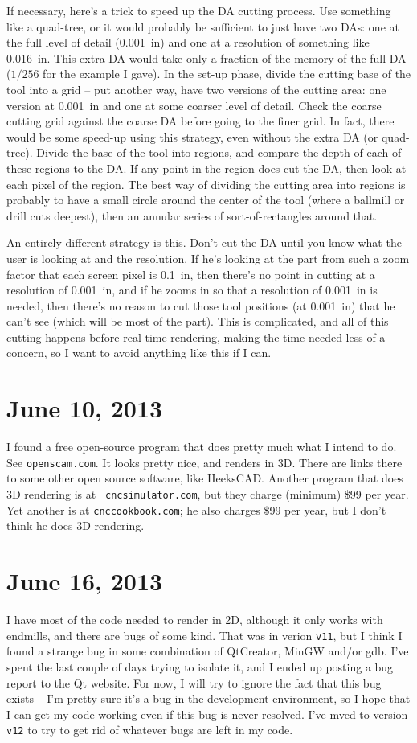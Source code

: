 \documentclass[titlepage,oneside,10pt]{article}
\begin{document}
If necessary, here's a trick to speed up the DA cutting process. Use
something like a quad-tree, or it would probably be sufficient to just
have two DAs: one at the full level of detail (0.001~in) and one at a
resolution of something like 0.016~in. This extra DA would take only a
fraction of the memory of the full DA ($1/256$ for the example I
gave). In the set-up phase, divide the cutting base of the tool into a
grid -- put another way, have two versions of the cutting area: one
version at 0.001~in and one at some coarser level of detail. Check the
coarse cutting grid against the coarse DA before going to the finer
grid. In fact, there would be some speed-up using this strategy, even
without the extra DA (or quad-tree). Divide the base of the tool into
regions, and compare the depth of each of these regions to the DA. If
any point in the region does cut the DA, then look at each pixel of
the region. The best way of dividing the cutting area into regions is
probably to have a small circle around the center of the tool (where a
ballmill or drill cuts deepest), then an annular series of
sort-of-rectangles around that.

An entirely different strategy is this. Don't cut the DA until you
know what the user is looking at and the resolution. If he's looking
at the part from such a zoom factor that each screen pixel is 0.1~in,
then there's no point in cutting at a resolution of 0.001~in, and if
he zooms in so that a resolution of 0.001~in is needed, then there's no
reason to cut those tool positions (at 0.001~in) that he can't
see (which will be most of the part). This is complicated, and all of
this cutting happens before real-time rendering, making the time needed
less of a concern, so I want to avoid anything like this if I can. 

\section{June 10, 2013}

I found a free open-source program that does pretty much what I intend
to do. See {\tt openscam.com}. It looks pretty nice, and renders in
3D. There are links there to some other open source software, like
HeeksCAD. Another program that does 3D rendering is at {\tt
  cncsimulator.com}, but they charge (minimum) \$99 per year. Yet
another is at {\tt cnccookbook.com}; he also charges \$99 per year,
but I don't think he does 3D rendering.

\section{June 16, 2013}
I have most of the code needed to render in 2D, although it only works
with endmills, and there are bugs of some kind. That was in verion
{\tt v11}, but I think I found a strange bug in some combination of
QtCreator, MinGW and/or gdb. I've spent the last couple of days trying
to isolate it, and I ended up posting a bug report to the Qt
website. For now, I will try to ignore the fact that this bug exists
-- I'm pretty sure it's a bug in the development environment, so I
hope that I can get my code working even if this bug is never
resolved. I've mved to version {\tt v12} to try to get rid of whatever
bugs are left in my code.
\end{document}
